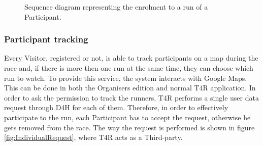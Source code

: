            \begin{figure}[H]
                \centering
                \caption{Sequence diagram representing the enrolment to a run of a Participant.}
                \label{fig:T4R-participant-enrolment}
            \end{figure}
            
        \subsubsection{Participant tracking}
            
            Every Visitor, registered or not, is able to track participants on a map during the race and, if there is more then one run at the same time, they can choose which run to watch. To provide this service, the system interacts with Google Maps. This can be done in both the Organisers edition and normal T4R application.
            In order to ask the permission to track the runners, T4R performs a single user data request through D4H for each of them. Therefore, in order to effectively participate to the run, each Participant has to accept the request, otherwise he gets removed from the race. The way the request is performed is shown in figure \ref{fig:IndividualRequest}, where T4R acts as a Third-party.
            
